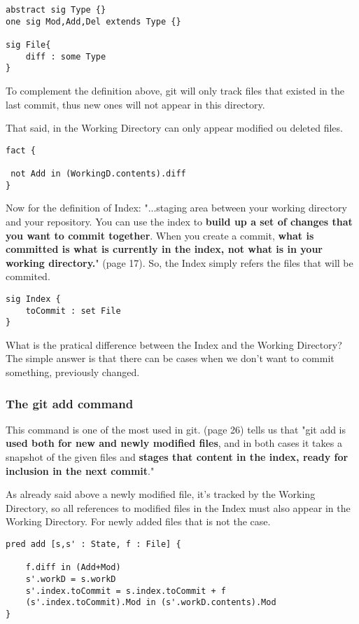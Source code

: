 \begin{lstlisting}
abstract sig Type {}
one sig Mod,Add,Del extends Type {}

sig File{
	diff : some Type	
}
\end{lstlisting}

To complement the definition above, git will only
track files that existed in the last commit, thus
new ones will not appear in this directory. \par 
That said, in the Working Directory can only appear
modified ou deleted files. \par

\begin{lstlisting}
fact {

 not Add in (WorkingD.contents).diff
}
\end{lstlisting}

Now for the definition of Index:
"...staging area between your working directory and your
repository. You can use the index to {\bf build up a set of 
changes that you want to commit together}. When you create
a commit, {\bf what is committed is what is currently in the
index, not what is in your working directory.}"
\cite{gitComm} (page 17). So, the Index simply refers the files
that will be commited.

\begin{lstlisting}
sig Index {
	toCommit : set File
}
\end{lstlisting}

What is the pratical difference between the Index and the Working
Directory? The simple answer is that there can be cases when we don't want
to commit something, previously changed.

\subsubsection{The git add command}

This command is one of the most used in git. \cite{gitComm} (page 26)
tells us that
"git add is {\bf used both for new and newly modified files},
and in both cases it takes a snapshot of the given files
and {\bf stages that content in the index, ready for inclusion
in the next commit}." \par 
As already said above a newly modified file, it's tracked by
the Working Directory, so all references to modified files in
the Index must also appear in the Working Directory. For newly
added files that is not the case.
\begin{lstlisting}
pred add [s,s' : State, f : File] {
  
    f.diff in (Add+Mod) 
    s'.workD = s.workD
    s'.index.toCommit = s.index.toCommit + f 
    (s'.index.toCommit).Mod in (s'.workD.contents).Mod
}

\end{lstlisting}

